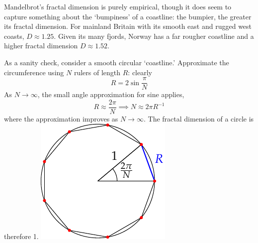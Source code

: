 Mandelbrot's fractal dimension is purely empirical, though it does seem to capture something about the `bumpiness' of a coastline: the bumpier, the greater its fractal dimension. For mainland Britain with its smooth east and rugged west coasts, $D\approx 1.25$. Given its many fjords, Norway has a far rougher coastline and a higher fractal dimension $D\approx 1.52$.

\begin{example}[lower separated=false, sidebyside, sidebyside align=top seam, sidebyside gap=0pt, righthand width=0.29\linewidth]{}{}
As a sanity check, consider a smooth circular `coastline.' Approximate the circumference using $N$ rulers of length $R$: clearly
\[R=2\sin\frac\pi N\]
As $N\to\infty$, the small angle approximation for sine applies,
\[R\approx \frac{2\pi}N\implies N\approx 2\pi R^{-1}\]
where the approximation improves as $N\to\infty$. The fractal dimension of a circle is therefore 1.
\tcblower
\flushright\includegraphics{circle}
\end{example}
\goodbreak


